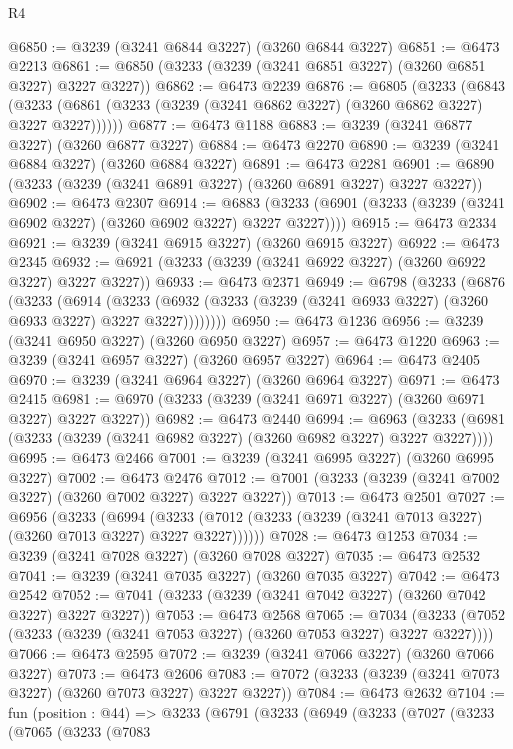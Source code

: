 \begin{lexlean}{R4}
\begin{coremodule}
@6850 := @3239 (@3241 @6844 @3227) (@3260 @6844 @3227)
@6851 := @6473 @2213
@6861 := @6850 (@3233 (@3239 (@3241 @6851 @3227) (@3260 @6851 @3227) @3227 @3227))
@6862 := @6473 @2239
@6876 := @6805
    (@3233
      (@6843 (@3233 (@6861 (@3233 (@3239 (@3241 @6862 @3227) (@3260 @6862 @3227) @3227 @3227))))))
@6877 := @6473 @1188
@6883 := @3239 (@3241 @6877 @3227) (@3260 @6877 @3227)
@6884 := @6473 @2270
@6890 := @3239 (@3241 @6884 @3227) (@3260 @6884 @3227)
@6891 := @6473 @2281
@6901 := @6890 (@3233 (@3239 (@3241 @6891 @3227) (@3260 @6891 @3227) @3227 @3227))
@6902 := @6473 @2307
@6914 := @6883 (@3233 (@6901 (@3233 (@3239 (@3241 @6902 @3227) (@3260 @6902 @3227) @3227 @3227))))
@6915 := @6473 @2334
@6921 := @3239 (@3241 @6915 @3227) (@3260 @6915 @3227)
@6922 := @6473 @2345
@6932 := @6921 (@3233 (@3239 (@3241 @6922 @3227) (@3260 @6922 @3227) @3227 @3227))
@6933 := @6473 @2371
@6949 := @6798
    (@3233
      (@6876
        (@3233
          (@6914
            (@3233 (@6932 (@3233 (@3239 (@3241 @6933 @3227) (@3260 @6933 @3227) @3227 @3227))))))))
@6950 := @6473 @1236
@6956 := @3239 (@3241 @6950 @3227) (@3260 @6950 @3227)
@6957 := @6473 @1220
@6963 := @3239 (@3241 @6957 @3227) (@3260 @6957 @3227)
@6964 := @6473 @2405
@6970 := @3239 (@3241 @6964 @3227) (@3260 @6964 @3227)
@6971 := @6473 @2415
@6981 := @6970 (@3233 (@3239 (@3241 @6971 @3227) (@3260 @6971 @3227) @3227 @3227))
@6982 := @6473 @2440
@6994 := @6963 (@3233 (@6981 (@3233 (@3239 (@3241 @6982 @3227) (@3260 @6982 @3227) @3227 @3227))))
@6995 := @6473 @2466
@7001 := @3239 (@3241 @6995 @3227) (@3260 @6995 @3227)
@7002 := @6473 @2476
@7012 := @7001 (@3233 (@3239 (@3241 @7002 @3227) (@3260 @7002 @3227) @3227 @3227))
@7013 := @6473 @2501
@7027 := @6956
    (@3233
      (@6994 (@3233 (@7012 (@3233 (@3239 (@3241 @7013 @3227) (@3260 @7013 @3227) @3227 @3227))))))
@7028 := @6473 @1253
@7034 := @3239 (@3241 @7028 @3227) (@3260 @7028 @3227)
@7035 := @6473 @2532
@7041 := @3239 (@3241 @7035 @3227) (@3260 @7035 @3227)
@7042 := @6473 @2542
@7052 := @7041 (@3233 (@3239 (@3241 @7042 @3227) (@3260 @7042 @3227) @3227 @3227))
@7053 := @6473 @2568
@7065 := @7034 (@3233 (@7052 (@3233 (@3239 (@3241 @7053 @3227) (@3260 @7053 @3227) @3227 @3227))))
@7066 := @6473 @2595
@7072 := @3239 (@3241 @7066 @3227) (@3260 @7066 @3227)
@7073 := @6473 @2606
@7083 := @7072 (@3233 (@3239 (@3241 @7073 @3227) (@3260 @7073 @3227) @3227 @3227))
@7084 := @6473 @2632
@7104 := fun (position : @44) =>
  @3233
    (@6791
      (@3233
        (@6949
          (@3233
            (@7027
              (@3233
                (@7065
                  (@3233
                    (@7083

\end{coremodule}
\end{lexlean}
